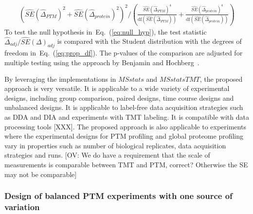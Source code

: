 \documentclass[mcp]{article}
\numberwithin{table}{section}
\def\todo#1{{\color{red}[#1]}}
\def\eqref#1{Eq.~(\ref{eq:#1})}
\begin{document}
\begin{eqnarray}
\left( \widehat{SE}(\hat{\Delta}_{PTM})^{2} + \widehat{SE}(\hat{\Delta}_{protein})^{2} \right)^2 \bigg/
\left( \frac{\widehat{SE}(\hat{\Delta}_{PTM})^{4}}{\mathrm{df}(\widehat{SE}(\hat{\Delta}_{PTM}))} + \frac{\widehat{SE}(\hat{\Delta}_{protein})^{4}}{ \mathrm{df}(\widehat{SE}(\hat{\Delta}_{protein}))} \right)
\label{eq:prop_df}
\end{eqnarray}
To test the null hypothesis in~\eqref{null_hyp}, the test statistic $\hat{\Delta}_{adj}/\widehat{SE}(\Delta)_{adj}$ is compared with the Student distribution with the degrees of freedom in~\eqref{prop_df}. The p-values of the comparison are adjusted for multiple testing using the approach by Benjamin and Hochberg~\cite{Benjamini:1995}.

By leveraging the implementations in $MSstats$ and $MSstatsTMT$, the proposed approach is very versatile. It is applicable to a wide variety of experimental designs, including group comparison, paired designs, time course designs and unbalanced designs. It is applicable to label-free data acquisition strategies such as DDA and DIA and experiments with TMT labeling. It is compatible with data processing tools \todo{XXX}. The proposed approach is also applicable to experiments where the experimental designs for PTM profiling and global proteome profiling vary in properties such as number of biological replicates, data acquisition strategies and runs. \todo{OV: We do have a requirement that the scale of measurements is comparable between TMT and PTM, correct? Otherwise the SE may not be comparable}

\subsubsection*{Design of balanced PTM experiments with one source of variation}
\label{sec:design}
\end{document}
